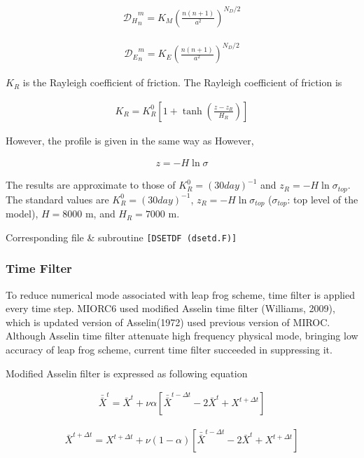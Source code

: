 \begin{eqnarray}
  {{\mathcal D}_H}_n^m = K_M \left( \frac{n(n+1)}{a^2} \right)^{N_D/2}
\end{eqnarray}

\begin{eqnarray}
  {{\mathcal D}_E}_n^m = K_E \left( \frac{n(n+1)}{a^2} \right)^{N_D/2}
\end{eqnarray}

\(K_R\) is the Rayleigh coefficient of friction. The Rayleigh
coefficient of friction is

\begin{eqnarray}
  K_R = K_R^0 \left[ 1+\tanh \left( \frac{z-z_R}{H_R} \right) \right]
\end{eqnarray}

However, the profile is given in the same way as However,

\begin{eqnarray}
  z = - H \ln \sigma
\end{eqnarray}

The results are approximate to those of \(K_R^0 = {(30day)}^{-1}\) and
\(z_R = -H \ln \sigma_{top}\). The standard values are
\(K_R^0 = {(30day)}^{-1}\), \(z_R = -H \ln \sigma_{top}\)
(\(\sigma_{top}\): top level of the model), \(H = 8000\) m, and
\(H_R = 7000\) m.

Corresponding file \& subroutine \texttt{{[}DSETDF\ (dsetd.F){]}}

\hypertarget{time-filter}{%
\subsubsection{Time Filter}\label{time-filter}}

To reduce numerical mode associated with leap frog scheme, time filter
is applied every time step. MIORC6 used modified Asselin time filter
(Williams, 2009), which is updated version of Asselin(1972) used
previous version of MIROC. Although Asselin time filter attenuate high
frequency physical mode, bringing low accuracy of leap frog scheme,
current time filter succeeded in suppressing it.

Modified Asselin filter is expressed as following equation

\begin{eqnarray}
 \bar{\bar{X}}^t = \bar{X}^t + \nu\alpha[\bar{\bar{X}}^{t-\Delta t} -2 \bar{X}^t + X^{t+\Delta t}]
\end{eqnarray}

\begin{eqnarray}
 \bar{X}^{t+\Delta t} = X^{t+\Delta t} + \nu(1-\alpha)[\bar{\bar{X}}^{t-\Delta t} -2 \bar{X}^t + X^{t+\Delta t}]
\end{eqnarray}


